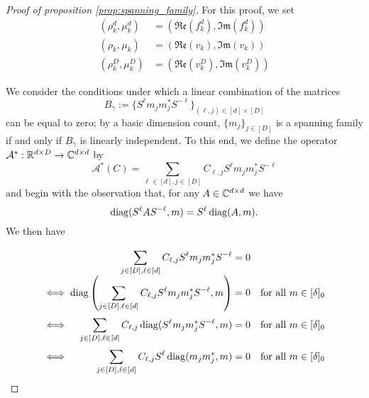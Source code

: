 \begin{proof}[Proof of proposition \ref{prop:spanning_family}]
  For this proof, we set \begin{align*} (\rho_k^d, \mu_k^d) &= (\mathfrak{Re}(f_k^d), \mathfrak{Im}(f_k^d)) \\ (\rho_k, \mu_k) &= (\mathfrak{Re}(v_k), \mathfrak{Im}(v_k)) \\ (\rho_k^D, \mu_k^D) &= (\mathfrak{Re}(v_k^D), \mathfrak{Im}(v_k^D)) \end{align*}
  
  We consider the conditions under which a linear combination of the matrices \[B_\gamma := \{S^\ell m_j m_j^* S^{-\ell}\}_{(\ell, j) \in [d] \times [D]}\] can be equal to zero; by a basic dimension count, $\{m_j\}_{j \in [D]}$ is a spanning family if and only if $B_\gamma$ is linearly independent.  To this end, we define the operator $\mathcal{A}^* : \mathbb{R}^{d \times D} \to \mathbb{C}^{d \times d}$ by \begin{equation} \mathcal{A}^*(C) = \sum_{\ell \in [d], j \in [D]} C_{\ell, j} S^\ell m_j m_j^* S^{-\ell} \label{eq:synth_op} \end{equation} and begin with the observation that, for any $A \in \mathbb{C}^{d \times d}$ we have \[\operatorname{diag}(S^\ell A S^{-\ell}, m) = S^\ell \operatorname{diag}(A, m).\]  We then have
  \[\arraycolsep=1.4pt\def\arraystretch{2}
  \begin{array}{c>{\displaystyle}rcl@{\quad}r}
    & \sum_{j \in [D], \ell \in [d]} C_{\ell, j} S^\ell m_j m_j^* S^{-\ell} & = & 0 & \\
    \iff & \diag\left(\sum_{j \in [D], \ell \in [d]} C_{\ell, j} S^\ell m_j m_j^* S^{-\ell}, m\right) & = & 0 & \text{for all} \ m \in [\delta]_0 \\
    \iff & \sum_{j \in [D], \ell \in [d]} C_{\ell, j} \diag(S^\ell m_j m_j^* S^{-\ell}, m) & = & 0 & \text{for all} \ m \in [\delta]_0 \\
    \iff & \sum_{j \in [D], \ell \in [d]} C_{\ell, j} S^{\ell} \diag(m_j m_j^*, m) & = & 0 & \text{for all} \ m \in [\delta]_0 \\
  \end{array}\]
  

\end{proof}
